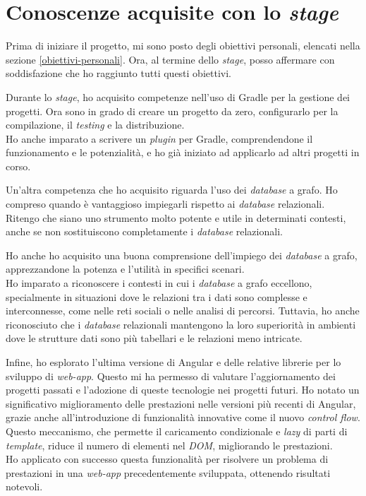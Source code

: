 \section{Conoscenze acquisite con lo \textit{stage}}
Prima di iniziare il progetto, mi sono posto degli obiettivi personali, 
elencati nella sezione \ref{obiettivi-personali}. Ora, al termine dello \textit{stage}, 
posso affermare con soddisfazione che ho raggiunto tutti questi obiettivi.

Durante lo \textit{stage}, ho acquisito competenze nell'uso di Gradle per la gestione dei progetti. 
Ora sono in grado di creare un progetto da zero, configurarlo per la compilazione, il \textit{testing} e la distribuzione. \\
Ho anche imparato a scrivere un \textit{plugin} per Gradle, comprendendone il funzionamento e le potenzialità, 
e ho già iniziato ad applicarlo ad altri progetti in corso.

Un'altra competenza che ho acquisito riguarda l'uso dei \textit{database} a grafo. 
Ho compreso quando è vantaggioso impiegarli rispetto ai \textit{database} relazionali. 
Ritengo che siano uno strumento molto potente e utile in determinati contesti, 
anche se non sostituiscono completamente i \textit{database} relazionali.

Ho anche ho acquisito una buona comprensione dell'impiego dei \textit{database} a grafo, 
apprezzandone la potenza e l'utilità in specifici scenari. \\
Ho imparato a riconoscere i contesti in cui 
i \textit{database} a grafo eccellono, specialmente in situazioni dove le relazioni tra i dati sono complesse 
e interconnesse, come nelle reti sociali o nelle analisi di percorsi. Tuttavia, ho anche riconosciuto che 
i \textit{database} relazionali mantengono la loro superiorità in ambienti dove le strutture dati sono più 
tabellari e le relazioni meno intricate.

Infine, ho esplorato l'ultima versione di Angular e delle relative librerie per lo sviluppo di \textit{web-app}. 
Questo mi ha permesso di valutare l'aggiornamento dei progetti passati e l'adozione di queste tecnologie nei progetti futuri. 
Ho notato un significativo miglioramento delle prestazioni nelle versioni più recenti di Angular, grazie anche all'introduzione 
di funzionalità innovative come il nuovo \textit{control flow}. Questo meccanismo, che permette il caricamento condizionale 
e \textit{lazy} di parti di \textit{template}, riduce il numero di elementi nel \textit{DOM}, migliorando le prestazioni. \\
Ho applicato con successo questa funzionalità per risolvere un problema di prestazioni in una \textit{web-app} precedentemente sviluppata, 
ottenendo risultati notevoli.